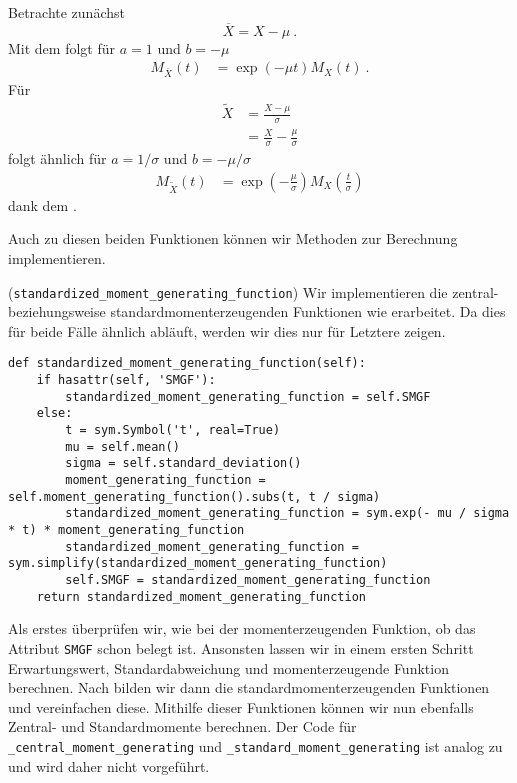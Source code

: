 \begin{Beweis}{}
Betrachte zunächst
\[\overline{X} = X - \mu~.\]
Mit dem \hyperlink{Satz:Verschiebesatz}{} folgt für $a = 1$ und $b = - \mu$
\begin{align*}
M_{\overline{X}}(t) &= \exp(- \mu t) M_X(t)~.
\end{align*}
Für
\begin{align*}
\tilde{X} &= \frac{X - \mu}{\sigma}\\
&= \frac{X}{\sigma} - \frac{\mu}{\sigma}
\end{align*}
folgt ähnlich für $a = 1 / \sigma$ und $b = - \mu / \sigma$
\begin{align*}
M_{\tilde{X}}(t) &= \exp\left( - \frac{\mu}{\sigma} \right) M_X\left( \frac{t}{\sigma} \right)
\end{align*}
dank dem \hyperlink{Satz:Verschiebesatz}{}.
\end{Beweis}

\medskip

Auch zu diesen beiden Funktionen können wir Methoden zur Berechnung implementieren.

\begin{Code}{(\lstinline|standardized_moment_generating_function|)}
Wir implementieren die zentral- beziehungsweise standardmomenterzeugenden Funktionen wie \hyperlink{Satz:ZSMomErzFun}{} erarbeitet. Da dies für beide Fälle ähnlich abläuft, werden wir dies nur für Letztere zeigen.
\begin{lstlisting}
def standardized_moment_generating_function(self):
    if hasattr(self, 'SMGF'):
        standardized_moment_generating_function = self.SMGF
    else:
        t = sym.Symbol('t', real=True)
        mu = self.mean()
        sigma = self.standard_deviation()
        moment_generating_function = self.moment_generating_function().subs(t, t / sigma)
        standardized_moment_generating_function = sym.exp(- mu / sigma * t) * moment_generating_function
        standardized_moment_generating_function = sym.simplify(standardized_moment_generating_function)
        self.SMGF = standardized_moment_generating_function
    return standardized_moment_generating_function
\end{lstlisting}
Als erstes überprüfen wir, wie bei der momenterzeugenden Funktion, ob das Attribut \lstinline|SMGF| schon belegt ist. Ansonsten lassen wir in einem ersten Schritt Erwartungswert, Standardabweichung und momenterzeugende Funktion berechnen. Nach \hyperlink{Satz:ZSMomErzFun}{} bilden wir dann die standardmomenterzeugenden Funktionen und vereinfachen diese. Mithilfe dieser Funktionen können wir nun ebenfalls Zentral- und Standardmomente berechnen. Der Code für \lstinline|_central_moment_generating| und \lstinline|_standard_moment_generating| ist analog zu \hyperlink{Code:n_Moment_Generating}{} und wird daher nicht vorgeführt.
\end{Code}

